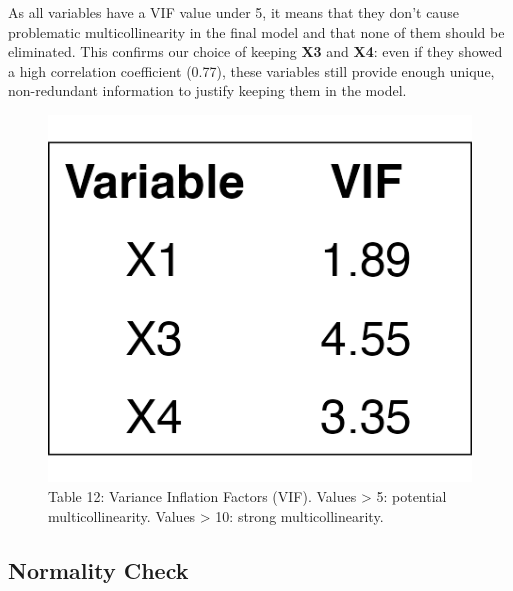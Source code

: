 \documentclass[
  12pt,
]{article}
\begin{document}
\begin{minipage}{0.6\textwidth}
\vspace{-0.5em}
As all variables have a VIF value under 5, it means that they don’t cause problematic multicollinearity in the final model and that none of them should be eliminated. This confirms our choice of keeping \textbf{X3} and \textbf{X4}: even if they showed a high correlation coefficient (0.77), these variables still provide enough unique, non-redundant information to justify keeping them in the model.
\end{minipage}
\hfill
\begin{minipage}{0.37\textwidth}
\vspace{-3em}
  \begin{figure}[H]
    \centering
    \includegraphics[width=0.8\linewidth]{figures/vif_table.png}
    \vspace{-0.5em}
    \captionsetup{font=normalsize}
    \caption*{Table 12: Variance Inflation Factors (VIF). Values > 5: potential multicollinearity. Values > 10: strong multicollinearity.}
  \end{figure}
\end{minipage}

\vspace{-1em}

\subsection{Normality Check}\label{normality-check}

\noindent
\end{document}
